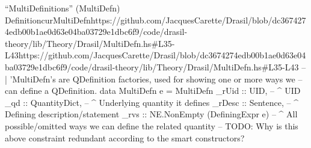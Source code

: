 \begin{haskell}{``MultiDefinitions'' (MultiDefn) Definition}{curMultiDefn}{https://github.com/JacquesCarette/Drasil/blob/dc3674274edb00b1ae0d63e04ba03729e1dbc\newline{}6f9/code/drasil-theory/lib/Theory/Drasil/MultiDefn.hs\#L35-L43}{https://github.com/JacquesCarette/Drasil/blob/dc3674274edb00b1ae0d63e04ba03729e1dbc6f9/code/drasil-theory/lib/Theory/Drasil/MultiDefn.hs\#L35-L43}
-- | 'MultiDefn's are QDefinition factories, used for showing one or more ways we
--   can define a QDefinition.
data MultiDefn e = MultiDefn {
    _rUid  :: UID,                         -- ^ UID
    _qd    :: QuantityDict,                -- ^ Underlying quantity it defines
    _rDesc :: Sentence,                    -- ^ Defining description/statement
    _rvs   :: NE.NonEmpty (DefiningExpr e) -- ^ All possible/omitted ways we can define the related quantity
           -- TODO: Why is this above constraint redundant according to the smart constructors?
}
\end{haskell}

